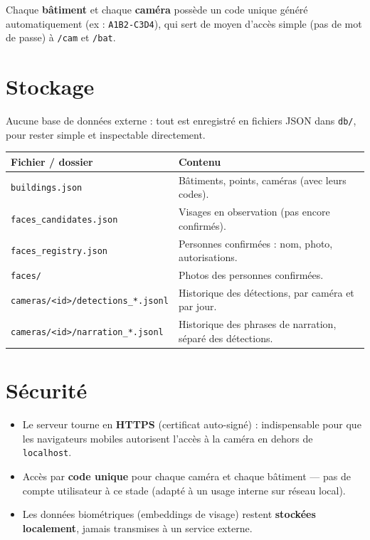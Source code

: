 \documentclass[11pt,a4paper]{article}
\begin{document}
Chaque \textbf{b\^atiment} et chaque \textbf{cam\'era} poss\`ede un code unique g\'en\'er\'e
automatiquement (ex : \texttt{A1B2-C3D4}), qui sert de moyen d'acc\`es simple (pas de mot de passe) \`a
\texttt{/cam} et \texttt{/bat}.

\section{Stockage}

Aucune base de donn\'ees externe : tout est enregistr\'e en fichiers JSON dans \texttt{db/}, pour
rester simple et inspectable directement.

\begin{center}
\renewcommand{\arraystretch}{1.3}
\begin{tabularx}{\linewidth}{@{}lX@{}}
\hline
\textbf{Fichier / dossier} & \textbf{Contenu} \\
\hline
\texttt{buildings.json} & B\^atiments, points, cam\'eras (avec leurs codes). \\
\texttt{faces\_candidates.json} & Visages en observation (pas encore confirm\'es). \\
\texttt{faces\_registry.json} & Personnes confirm\'ees : nom, photo, autorisations. \\
\texttt{faces/} & Photos des personnes confirm\'ees. \\
\texttt{cameras/<id>/detections\_*.jsonl} & Historique des d\'etections, par cam\'era et par jour. \\
\texttt{cameras/<id>/narration\_*.jsonl} & Historique des phrases de narration, s\'epar\'e des d\'etections. \\
\hline
\end{tabularx}
\end{center}

\section{S\'ecurit\'e}

\begin{itemize}[leftmargin=1.2em, itemsep=3pt]
  \item Le serveur tourne en \textbf{HTTPS} (certificat auto-sign\'e) : indispensable pour que les
  navigateurs mobiles autorisent l'acc\`es \`a la cam\'era en dehors de \texttt{localhost}.
  \item Acc\`es par \textbf{code unique} pour chaque cam\'era et chaque b\^atiment — pas de compte
  utilisateur \`a ce stade (adapt\'e \`a un usage interne sur r\'eseau local).
  \item Les donn\'ees biom\'etriques (embeddings de visage) restent \textbf{stock\'ees localement},
  jamais transmises \`a un service externe.
\end{itemize}
\end{document}

